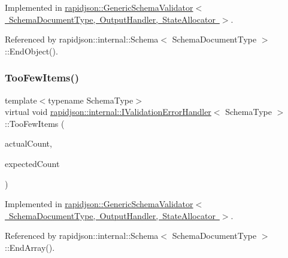 Implemented in \mbox{\hyperlink{classrapidjson_1_1_generic_schema_validator_ae2689c5db02a0f47bc986393c6a3f4ce}{rapidjson\+::\+Generic\+Schema\+Validator$<$ Schema\+Document\+Type, Output\+Handler, State\+Allocator $>$}}.



Referenced by rapidjson\+::internal\+::\+Schema$<$ Schema\+Document\+Type $>$\+::\+End\+Object().

\mbox{\label{classrapidjson_1_1internal_1_1_i_validation_error_handler_af86dfc82e6b4bd727ef69fba728dd8e4}} 
\subsubsection{\texorpdfstring{TooFewItems()}{TooFewItems()}}
{\footnotesize\ttfamily template$<$typename Schema\+Type$>$ \\
virtual void \mbox{\hyperlink{classrapidjson_1_1internal_1_1_i_validation_error_handler}{rapidjson\+::internal\+::\+I\+Validation\+Error\+Handler}}$<$ Schema\+Type $>$\+::Too\+Few\+Items (\begin{DoxyParamCaption}\item[{\mbox{\hyperlink{namespacerapidjson_a44eb33eaa523e36d466b1ced64b85c84}{Size\+Type}}}]{actual\+Count,  }\item[{\mbox{\hyperlink{namespacerapidjson_a44eb33eaa523e36d466b1ced64b85c84}{Size\+Type}}}]{expected\+Count }\end{DoxyParamCaption})\hspace{0.3cm}{\ttfamily [pure virtual]}}



Implemented in \mbox{\hyperlink{classrapidjson_1_1_generic_schema_validator_a96614fd25cd28294486f9212d49807eb}{rapidjson\+::\+Generic\+Schema\+Validator$<$ Schema\+Document\+Type, Output\+Handler, State\+Allocator $>$}}.



Referenced by rapidjson\+::internal\+::\+Schema$<$ Schema\+Document\+Type $>$\+::\+End\+Array().

\mbox{\label{classrapidjson_1_1internal_1_1_i_validation_error_handler_a7baac6bdae4e69e6fe187d4dbb9d27ed}} 
